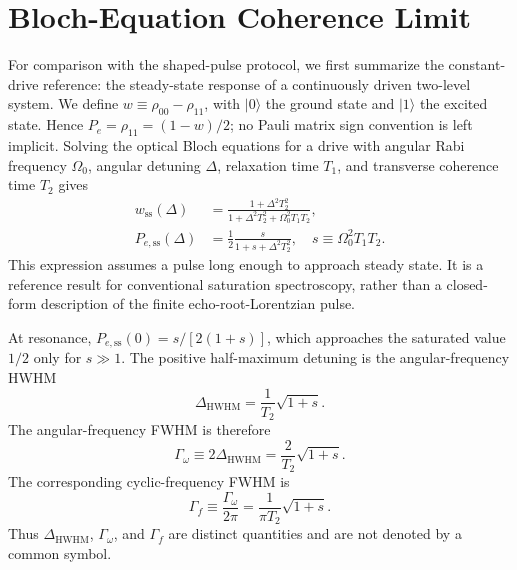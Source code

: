 \section{Bloch-Equation Coherence Limit}
\label{sec:t2-limit}

For comparison with the shaped-pulse protocol, we first summarize the
constant-drive reference: the steady-state response of a continuously driven
two-level system. We define
$w\equiv\rho_{00}-\rho_{11}$, with $\lvert0\rangle$ the ground state and
$\lvert1\rangle$ the excited state.  Hence $P_e=\rho_{11}=(1-w)/2$; no Pauli
matrix sign convention is left implicit.  Solving the optical Bloch equations for a drive
with angular Rabi frequency $\Omega_0$, angular detuning $\Delta$, relaxation
time $T_1$, and transverse coherence time $T_2$ gives~\cite{PhysRev.70.460}
\begin{equation}
    \begin{aligned}
    w_{\mathrm{ss}}(\Delta)
    &=
    \frac{1+\Delta^2T_2^2}
    {1+\Delta^2T_2^2+\Omega_0^2T_1T_2},
    \\
    P_{e,\mathrm{ss}}(\Delta)
    &=\frac{1}{2}
    \frac{s}{1+s+\Delta^2T_2^2},
    \quad s\equiv\Omega_0^2T_1T_2.
    \end{aligned}
    \label{eq:bloch-steady-state}
\end{equation}
This expression assumes a pulse long enough to approach steady state.  It is a
reference result for conventional saturation spectroscopy, rather than a
closed-form description of the finite echo-root-Lorentzian pulse.

At resonance, $P_{e,\mathrm{ss}}(0)=s/[2(1+s)]$, which approaches the
saturated value $1/2$ only for $s\gg1$.  The positive half-maximum detuning is
the angular-frequency HWHM
\begin{equation}
    \Delta_{\mathrm{HWHM}}
    =\frac{1}{T_2}\sqrt{1+s}.
    \label{eq:bloch-hwhm}
\end{equation}
The angular-frequency FWHM is therefore
\begin{equation}
    \Gamma_\omega
    \equiv 2\Delta_{\mathrm{HWHM}}
    =
    \frac{2}{T_2}
    \sqrt{1+s}.
    \label{eq:bloch-fwhm}
\end{equation}
The corresponding cyclic-frequency FWHM is
\begin{equation}
    \Gamma_f\equiv\frac{\Gamma_\omega}{2\pi}
    =\frac{1}{\pi T_2}\sqrt{1+s}.
    \label{eq:bloch-fwhm-hz}
\end{equation}
Thus $\Delta_{\mathrm{HWHM}}$, $\Gamma_\omega$, and $\Gamma_f$ are distinct
quantities and are not denoted by a common symbol.

